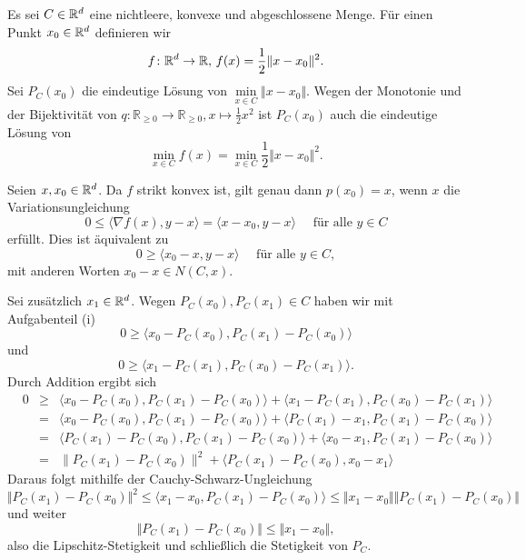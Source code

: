 
Es sei $C\in\mathbb{R}^d$ eine nichtleere, konvexe und abgeschlossene Menge. Für einen Punkt $x_0\in\mathbb{R}^d$ definieren wir
\begin{displaymath}
 f\colon \mathbb{R}^d\to\mathbb{R},\, f(x)=\frac{1}{2}\Vert x-x_0\Vert^2.
\end{displaymath}
Sei $P_C(x_0)$ die eindeutige Lösung von $\min\limits_{x\in C}\Vert x-x_0\Vert$. Wegen der Monotonie und der Bijektivität von $q: \mathbb R_{\geq 0}\to \mathbb R_{\geq 0}, x\mapsto \frac{1}{2}x^2$ ist $P_C(x_0)$ auch die eindeutige Lösung von $$\min_{x\in C}f(x)=\min_{x\in C}\frac{1}{2}\Vert x-x_0\Vert^2.$$
\begin{compactenum}[(i)]
 \item Seien $x,x_0\in \mathbb{R}^d$. Da $f$ strikt konvex ist, gilt genau dann $p(x_0)=x$, wenn $x$ die Variationsungleichung
 \begin{displaymath}
  0\leq \langle \nabla f(x),y-x\rangle=\langle x-x_0,y-x\rangle \quad\text{ für alle }y\in C
 \end{displaymath} erfüllt.
 Dies ist äquivalent zu
 \begin{displaymath}
  0\geq \langle x_0-x,y-x\rangle \quad\text{ für alle }y\in C,
 \end{displaymath}
 mit anderen Worten $x_0-x\in N(C,x)$.
 \\
 \item Sei zusätzlich $x_1\in \mathbb{R}^d$. Wegen $P_C(x_0),P_C(x_1)\in C$ haben wir mit Aufgabenteil (i)
 \begin{displaymath}
    0\geq \langle x_0-P_C(x_0),P_C(x_1)-P_C(x_0)\rangle 
 \end{displaymath}
 und
  \begin{displaymath}
    0\geq \langle x_1-P_C(x_1),P_C(x_0)-P_C(x_1)\rangle.
 \end{displaymath}
 Durch Addition ergibt sich
 \begin{align*}
 & 0&\geq& \langle x_0-P_C(x_0),P_C(x_1)-P_C(x_0)\rangle +\langle x_1-P_C(x_1),P_C(x_0)-P_C(x_1)\rangle \\
 &&=& \langle x_0-P_C(x_0),P_C(x_1)-P_C(x_0)\rangle +\langle P_C(x_1)-x_1,P_C(x_1)-P_C(x_0)\rangle \\
 &&=&\langle P_C(x_1)-P_C(x_0),P_C(x_1)-P_C(x_0)\rangle+\langle x_0-x_1,P_C(x_1)-P_C(x_0)\rangle\\
&&=&\| P_C(x_1)-P_C(x_0)\|^2+\langle P_C(x_1)-P_C(x_0),x_0-x_1\rangle
 \end{align*}
Daraus folgt mithilfe der Cauchy-Schwarz-Ungleichung
 \begin{displaymath}
  \Vert P_C(x_1)-P_C(x_0)\Vert^2 \leq \langle x_1-x_0,P_C(x_1)-P_C(x_0)\rangle\leq \Vert x_1-x_0\Vert \Vert P_C(x_1)-P_C(x_0)\Vert
 \end{displaymath}
 und weiter
 \begin{displaymath}
  \Vert P_C(x_1)-P_C(x_0)\Vert\leq \Vert x_1-x_0\Vert,
 \end{displaymath}
 also die Lipschitz-Stetigkeit und schließlich die Stetigkeit von $P_C$.
\end{compactenum}


